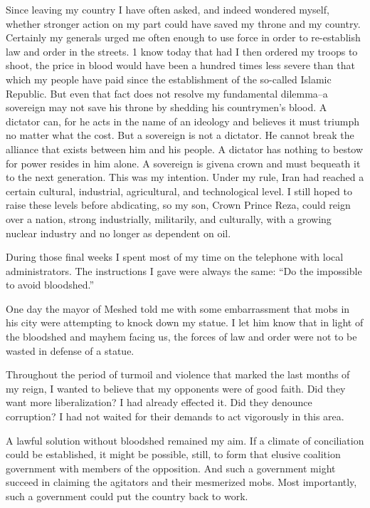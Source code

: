 Since leaving my country I have often asked, and indeed wondered myself, whether stronger action on my part could have saved my throne and my country. Certainly my generals urged me often enough to use force in order to re-establish law and order in the streets. 1 know today that had I then ordered my troops to shoot, the price in blood would have been a hundred times less severe than that which my people have paid since the establishment of the so-called Islamic Republic. But even that fact does not resolve my fundamental dilemma--a sovereign may not save his throne by shedding his countrymen’s blood. A dictator can, for he acts in the name of an ideology and believes it must triumph no matter what the cost. But a sovereign is not a dictator. He cannot break the alliance that exists between him and his people. A dictator has nothing to bestow for power resides in him alone. A sovereign is givena crown and must bequeath it to the next generation. This was my intention. Under my rule, Iran had reached a certain cultural, industrial, agricultural, and technological level. I still hoped to raise these levels before abdicating, so my son, Crown Prince Reza, could reign over a nation, strong industrially, militarily, and culturally, with a growing nuclear industry and no longer as dependent on oil. 

During those final weeks I spent most of my time on the telephone with local administrators. The instructions I gave were always the same: “Do the impossible to avoid bloodshed.” 

One day the mayor of Meshed told me with some embarrassment that mobs in his city were attempting to knock down my statue. I let him know that in light of the bloodshed and mayhem facing us, the forces of law and order were not to be wasted in defense of a statue. 

Throughout the period of turmoil and violence that marked the last months of my reign, I wanted to believe that my opponents were of good faith. Did they want more liberalization? I had already effected it. Did they denounce corruption? I had not waited for their demands to act vigorously in this area. 

A lawful solution without bloodshed remained my aim. If a climate of conciliation could be established, it might be possible, still, to form that elusive coalition government with members of the opposition. And such a government might succeed in claiming the agitators and their mesmerized mobs. Most importantly, such a government could put the country back to work. 

